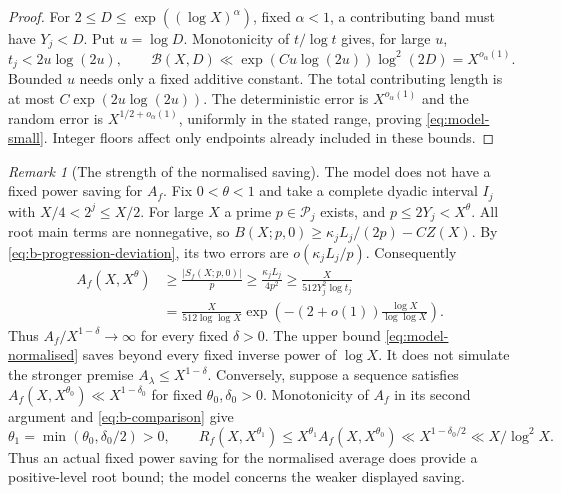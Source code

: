 \documentclass[11pt]{article}
\theoremstyle{definition}
\theoremstyle{remark}
\newtheorem{remark}[theorem]{Remark}
\numberwithin{equation}{section}
\begin{document}
\begin{proof}
For $2\le D\le\exp((\log X)^\alpha)$, fixed $\alpha<1$, a contributing band must have $Y_j<D$.
Put $u=\log D$. Monotonicity of $t/\log t$ gives, for large $u$,
\begin{equation}\label{eq:b-small-bands}
 t_j<2u\log(2u),\qquad
 \mathcal B(X,D)\ll\exp(Cu\log(2u))\log^2(2D)=X^{o_\alpha(1)}.
\end{equation}
Bounded $u$ needs only a fixed additive constant. The total contributing length is at most
$C\exp(2u\log(2u))$. The deterministic error is $X^{o_\alpha(1)}$ and the random error is
$X^{1/2+o_\alpha(1)}$, uniformly in the stated range, proving \eqref{eq:model-small}.
Integer floors affect only endpoints already included in these bounds.
\end{proof}

\begin{remark}[The strength of the normalised saving]\label{rem:b-lower}
The model does not have a fixed power saving for $A_f$.
Fix $0<\theta<1$ and take a complete dyadic interval $I_j$ with $X/4<2^j\le X/2$.
For large $X$ a prime $p\in\mathcal P_j$ exists, and $p\le2Y_j<X^\theta$.
All root main terms are nonnegative, so
$B(X;p,0)\ge\kappa_jL_j/(2p)-CZ(X)$.
By \eqref{eq:b-progression-deviation}, its two errors are $o(\kappa_jL_j/p)$.
Consequently
\begin{equation}\label{eq:b-normalised-lower}
\begin{aligned}
 A_f(X,X^\theta)&\ge\frac{|S_f(X;p,0)|}{p}\ge\frac{\kappa_jL_j}{4p^2}
 \ge\frac{X}{512Y_j^2\log t_j}\\
 &=\frac{X}{512\log\log X}
 \exp\left(-(2+o(1))\frac{\log X}{\log\log X}\right).
\end{aligned}
\end{equation}
Thus $A_f/X^{1-\delta}\to\infty$ for every fixed $\delta>0$.
The upper bound \eqref{eq:model-normalised} saves beyond every fixed inverse power of $\log X$.
It does not simulate the stronger premise $A_\lambda\le X^{1-\delta}$.
Conversely, suppose a sequence satisfies $A_f(X,X^{\theta_0})\ll X^{1-\delta_0}$ for fixed
$\theta_0,\delta_0>0$. Monotonicity of $A_f$ in its second argument and \eqref{eq:b-comparison} give
\begin{equation}\label{eq:b-fixed-power-consumer}
 \theta_1=\min(\theta_0,\delta_0/2)>0,\qquad
 R_f(X,X^{\theta_1})\le X^{\theta_1}A_f(X,X^{\theta_0})
 \ll X^{1-\delta_0/2}\ll X/\log^2X.
\end{equation}
Thus an actual fixed power saving for the normalised average does provide a positive-level root bound;
the model concerns the weaker displayed saving.
\end{remark}
\end{document}
